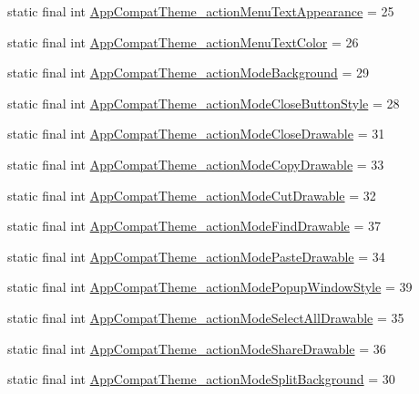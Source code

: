 \begin{DoxyCompactItemize}
\item 
static final int \hyperlink{classproject4_1_1xaria_1_1R_1_1styleable_aaf321468ea719fc98d678e0a033cf5b4}{App\+Compat\+Theme\+\_\+action\+Menu\+Text\+Appearance} = 25
\item 
static final int \hyperlink{classproject4_1_1xaria_1_1R_1_1styleable_a3a86c177d90451263e2f960e5e8dd93f}{App\+Compat\+Theme\+\_\+action\+Menu\+Text\+Color} = 26
\item 
static final int \hyperlink{classproject4_1_1xaria_1_1R_1_1styleable_a1456e2fb73b019f4b692d2ba615b5933}{App\+Compat\+Theme\+\_\+action\+Mode\+Background} = 29
\item 
static final int \hyperlink{classproject4_1_1xaria_1_1R_1_1styleable_a8f8cf06f9ecf3ab9f45c305f87f20707}{App\+Compat\+Theme\+\_\+action\+Mode\+Close\+Button\+Style} = 28
\item 
static final int \hyperlink{classproject4_1_1xaria_1_1R_1_1styleable_a2985c0df6c42837198bb3acd6f1017e8}{App\+Compat\+Theme\+\_\+action\+Mode\+Close\+Drawable} = 31
\item 
static final int \hyperlink{classproject4_1_1xaria_1_1R_1_1styleable_a22f8d7130857992c2c71953f7ab16efb}{App\+Compat\+Theme\+\_\+action\+Mode\+Copy\+Drawable} = 33
\item 
static final int \hyperlink{classproject4_1_1xaria_1_1R_1_1styleable_aaaa9698521dccac48903def6aa3f1607}{App\+Compat\+Theme\+\_\+action\+Mode\+Cut\+Drawable} = 32
\item 
static final int \hyperlink{classproject4_1_1xaria_1_1R_1_1styleable_a583749c75ba069fcac9c2290f3422f99}{App\+Compat\+Theme\+\_\+action\+Mode\+Find\+Drawable} = 37
\item 
static final int \hyperlink{classproject4_1_1xaria_1_1R_1_1styleable_a39092e8a0c13ec2bfb8555ab61ff14d1}{App\+Compat\+Theme\+\_\+action\+Mode\+Paste\+Drawable} = 34
\item 
static final int \hyperlink{classproject4_1_1xaria_1_1R_1_1styleable_a417ee14da32163c43ef73a9115b2a4e8}{App\+Compat\+Theme\+\_\+action\+Mode\+Popup\+Window\+Style} = 39
\item 
static final int \hyperlink{classproject4_1_1xaria_1_1R_1_1styleable_aff61e2a5924190bb7479ef2b13c8c7c0}{App\+Compat\+Theme\+\_\+action\+Mode\+Select\+All\+Drawable} = 35
\item 
static final int \hyperlink{classproject4_1_1xaria_1_1R_1_1styleable_ac049b8452b5594eff2fe1f6122e11e61}{App\+Compat\+Theme\+\_\+action\+Mode\+Share\+Drawable} = 36
\item 
static final int \hyperlink{classproject4_1_1xaria_1_1R_1_1styleable_a9e837df09f706dbb1c0d790a493f48ba}{App\+Compat\+Theme\+\_\+action\+Mode\+Split\+Background} = 30

\end{DoxyCompactItemize}
